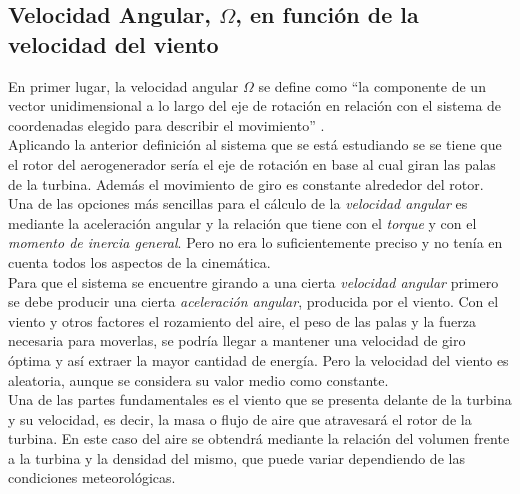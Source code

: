  
\subsection{Velocidad Angular, $\Omega$, en función de la velocidad del viento }

En primer lugar, la velocidad angular $\Omega$ se define como ``la componente de un vector unidimensional a lo largo del eje de rotación en relación con el sistema de coordenadas elegido para describir el movimiento'' \cite[p.~303]{cummings2004understanding}.\\

Aplicando la anterior definición al sistema que se está estudiando se se tiene que el rotor del aerogenerador sería el eje de rotación en base al cual giran las palas de la turbina. Además el movimiento de giro es constante alrededor del rotor.\\

Una de las opciones más sencillas para el cálculo de la \textit{velocidad angular} es mediante la aceleración angular y la relación que tiene con el \textit{torque} y con el \textit{momento de inercia general}. Pero no era lo suficientemente preciso y no tenía en cuenta todos los aspectos de la cinemática. \\
 
Para que el sistema se encuentre girando a una cierta \textit{velocidad angular} primero se debe producir una cierta \textit{aceleración angular}, producida por el viento. Con el viento y otros factores el rozamiento del aire, el peso de las palas y la fuerza necesaria para moverlas, se podría llegar a mantener una velocidad de giro óptima y así extraer la mayor cantidad de energía. Pero la velocidad del viento es aleatoria, aunque se considera su valor medio como constante.\\


Una de las partes fundamentales es el viento que se presenta delante de la turbina y su velocidad, es decir, la masa o flujo de aire que atravesará el rotor de la turbina. En este caso del aire se obtendrá mediante la relación del volumen frente a la turbina y la densidad del mismo, que puede variar dependiendo de las condiciones meteorológicas.\\


